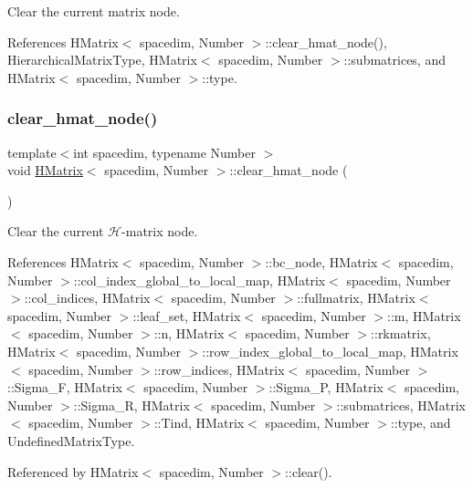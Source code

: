 Clear the current matrix node.

References H\+Matrix$<$ spacedim, Number $>$\+::clear\+\_\+hmat\+\_\+node(), Hierarchical\+Matrix\+Type, H\+Matrix$<$ spacedim, Number $>$\+::submatrices, and H\+Matrix$<$ spacedim, Number $>$\+::type.

\mbox{\label{classHMatrix_aec0815bc9c3654391bb2b3095383e6cb}} 
\subsubsection{\texorpdfstring{clear\+\_\+hmat\+\_\+node()}{clear\_hmat\_node()}}
{\footnotesize\ttfamily template$<$int spacedim, typename Number $>$ \\
void \hyperlink{classHMatrix}{H\+Matrix}$<$ spacedim, Number $>$\+::clear\+\_\+hmat\+\_\+node (\begin{DoxyParamCaption}{ }\end{DoxyParamCaption})}

Clear the current $\mathcal{H}$-\/matrix node. 

References H\+Matrix$<$ spacedim, Number $>$\+::bc\+\_\+node, H\+Matrix$<$ spacedim, Number $>$\+::col\+\_\+index\+\_\+global\+\_\+to\+\_\+local\+\_\+map, H\+Matrix$<$ spacedim, Number $>$\+::col\+\_\+indices, H\+Matrix$<$ spacedim, Number $>$\+::fullmatrix, H\+Matrix$<$ spacedim, Number $>$\+::leaf\+\_\+set, H\+Matrix$<$ spacedim, Number $>$\+::m, H\+Matrix$<$ spacedim, Number $>$\+::n, H\+Matrix$<$ spacedim, Number $>$\+::rkmatrix, H\+Matrix$<$ spacedim, Number $>$\+::row\+\_\+index\+\_\+global\+\_\+to\+\_\+local\+\_\+map, H\+Matrix$<$ spacedim, Number $>$\+::row\+\_\+indices, H\+Matrix$<$ spacedim, Number $>$\+::\+Sigma\+\_\+F, H\+Matrix$<$ spacedim, Number $>$\+::\+Sigma\+\_\+P, H\+Matrix$<$ spacedim, Number $>$\+::\+Sigma\+\_\+R, H\+Matrix$<$ spacedim, Number $>$\+::submatrices, H\+Matrix$<$ spacedim, Number $>$\+::\+Tind, H\+Matrix$<$ spacedim, Number $>$\+::type, and Undefined\+Matrix\+Type.



Referenced by H\+Matrix$<$ spacedim, Number $>$\+::clear().

\mbox{\label{classHMatrix_a525ad4d453f4f496b98cccb341c8b60b}} 
